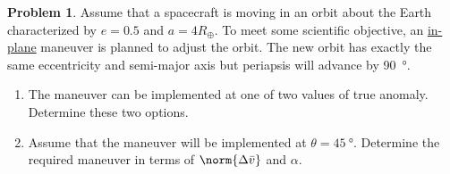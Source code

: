 \documentclass[10pt]{article}
\theoremstyle{definition}
\newtheorem{prob}{Problem}[section]
\newenvironment{subprob}%
{\renewcommand{\theenumi}{\alph{enumi}}\renewcommand{\labelenumi}{(\theenumi)}\begin{enumerate}}%
{\end{enumerate}}%
\newcommand{\extrapage}{\clearpage\newpage\null\newpage}
\begin{document}
\extrapage
\extrapage

\begin{prob}
    Assume that a spacecraft is moving in an orbit about the Earth characterized by \( e = 0.5\) and \( a = 4 R_\oplus\).
    To meet some scientific objective, an \underline{in-plane} maneuver is planned to adjust the orbit.
    The new orbit has exactly the same eccentricity and semi-major axis but periapsis will advance by \SI{90}{\degree}.
    \begin{subprob}
        \item The maneuver can be implemented at one of two values of true anomaly. 
            Determine these two options.
        \item Assume that the maneuver will be implemented at \( \theta = \SI{45}{\degree}\).
            Determine the required maneuver in terms of \( \norm{\Delta \bar v} \) and \(\alpha\).
    \end{subprob}
\end{prob}

\extrapage
\extrapage
\end{document}
